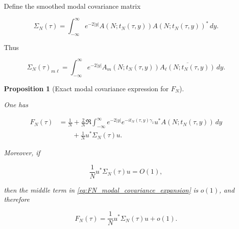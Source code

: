 \documentclass[11pt]{amsart}
\numberwithin{equation}{section}
\theoremstyle{plain}
\newtheorem{proposition}[theorem]{Proposition}
\theoremstyle{definition}
\theoremstyle{remark}
\begin{document}
Define the smoothed modal covariance matrix

\begin{equation}
\Sigma_N(\tau)
=
\int_{-\infty}^{\infty}
e^{-2|y|}
A(N;t_N(\tau,y))A(N;t_N(\tau,y))^*
\,dy.
\label{eq:smoothed_modal_covariance_matrix}
\end{equation}

Thus

\begin{equation}
\Sigma_N(\tau)_{m\ell}
=
\int_{-\infty}^{\infty}
e^{-2|y|}
A_m(N;t_N(\tau,y))
\overline{A_\ell(N;t_N(\tau,y))}
\,dy.
\label{eq:smoothed_modal_covariance_entries}
\end{equation}

\begin{proposition}[Exact modal covariance expression for \(F_N\)]
\label{prop:modal_covariance_expression_for_FN}

One has

\begin{align}
F_N(\tau)
&=
\frac1N
+
\frac{2}{N}
\Re
\int_{-\infty}^{\infty}
e^{-2|y|}
e^{-it_N(\tau,y)\gamma_1}
u^*A(N;t_N(\tau,y))
\,dy
\nonumber\\
&\qquad
+
\frac1N
u^*\Sigma_N(\tau)u.
\label{eq:FN_modal_covariance_expansion}
\end{align}

Moreover, if

\begin{equation}
\frac1N u^*\Sigma_N(\tau)u=O(1),
\label{eq:modal_covariance_boundedness_assumption}
\end{equation}

then the middle term in \eqref{eq:FN_modal_covariance_expansion} is
\(o(1)\), and therefore

\begin{equation}
F_N(\tau)
=
\frac1N u^*\Sigma_N(\tau)u+o(1).
\label{eq:FN_as_modal_covariance_contraction}
\end{equation}

\end{proposition}
\end{document}
